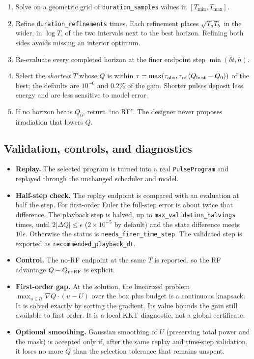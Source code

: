 \documentclass[11pt]{article}
\newcommand{\code}[1]{\texttt{#1}}
\begin{document}
\begin{enumerate}
\item Solve on a geometric grid of \code{duration\_samples} values in \([T_{\min},T_{\max}]\).
\item Refine \code{duration\_refinements} times. Each refinement places \(\sqrt{T_aT_b}\) in the
wider, in \(\log T\), of the two intervals next to the best horizon. Refining both sides avoids
missing an interior optimum.
\item Re-evaluate every completed horizon at the finer endpoint step
\(\min(\delta t,h)\).
\item Select the \emph{shortest} \(T\) whose \(Q\) is within
\(\tau=\max(\tau_{\rm abs},\tau_{\rm rel}(Q_{\rm best}-Q_0))\) of the best; the defaults are
\(10^{-6}\) and 0.2\% of the gain. Shorter pulses deposit less energy and are less sensitive to
model error.
\item If no horizon beats \(Q_0\), return ``no RF''. The designer never proposes irradiation that
lowers \(Q\).
\end{enumerate}

\subsection{Validation, controls, and diagnostics}
\label{sec:validation}

\begin{itemize}
\item \textbf{Replay.} The selected program is turned into a real \code{PulseProgram} and
replayed through the unchanged scheduler and model.
\item \textbf{Half-step check.} The replay endpoint is compared with an evaluation at half the
step. For first-order Euler the full-step error is about twice that difference. The playback
step is halved, up to \code{max\_validation\_halvings} times, until \(2|\Delta Q|\le\epsilon\)
(\(2\times10^{-5}\) by default) and the state difference meets \(10\epsilon\). Otherwise the
status is \code{needs\_finer\_time\_step}. The validated step is exported as
\code{recommended\_playback\_dt}.
\item \textbf{Control.} The no-RF endpoint at the same \(T\) is reported, so the RF advantage
\(Q-Q_{\rm noRF}\) is explicit.
\item \textbf{First-order gap.} At the solution, the linearized problem
\(\max_{u\in\mathcal{U}}\nabla Q\cdot(u-U)\) over the box plus budget is a continuous knapsack.
It is solved exactly by sorting the gradient. Its value bounds the gain still available to first
order. It is a local KKT diagnostic, not a global certificate.
\item \textbf{Optional smoothing.} Gaussian smoothing of \(U\) (preserving total power and the
mask) is accepted only if, after the same replay and time-step validation, it loses no more \(Q\)
than the selection tolerance that remains unspent.
\end{itemize}
\end{document}
